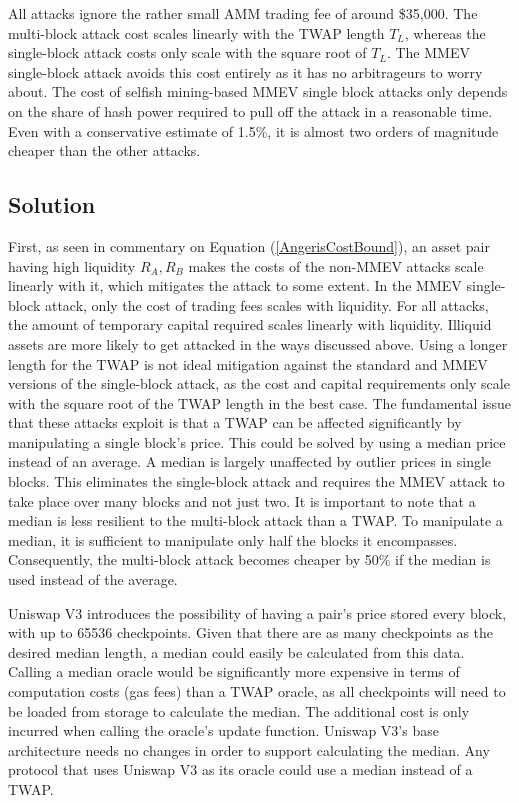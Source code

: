 \documentclass[conference]{IEEEtran}
\begin{document}
All attacks ignore the rather small AMM trading fee of around \$35,000. The multi-block attack cost scales linearly with the TWAP length $T_L$, whereas the single-block attack costs only scale with the square root of $T_L$. The MMEV single-block attack avoids this cost entirely as it has no arbitrageurs to worry about. The cost of selfish mining-based MMEV single block attacks only depends on the share of hash power required to pull off the attack in a reasonable time. Even with a conservative estimate of 1.5\%, it is almost two orders of magnitude cheaper than the other attacks.

\subsection{Solution \label{sectionPotentialSolution}}
First, as seen in commentary on Equation (\ref{AngerisCostBound}), an asset pair having high liquidity $R_A, R_B$ makes the costs of the non-MMEV attacks scale linearly with it, which mitigates the attack to some extent. In the MMEV single-block attack, only the cost of trading fees scales with liquidity. For all attacks, the amount of temporary capital required scales linearly with liquidity. Illiquid assets are more likely to get attacked in the ways discussed above. Using a longer length for the TWAP is not ideal mitigation against the standard and MMEV versions of the single-block attack, as the cost and capital requirements only scale with the square root of the TWAP length in the best case. The fundamental issue that these attacks exploit is that a TWAP can be affected significantly by manipulating a single block's price. This could be solved by using a median price instead of an average. A median is largely unaffected by outlier prices in single blocks. This eliminates the single-block attack and requires the MMEV attack to take place over many blocks and not just two. It is important to note that a median is less resilient to the multi-block attack than a TWAP. To manipulate a median, it is sufficient to manipulate only half the blocks it encompasses. Consequently, the multi-block attack becomes cheaper by 50\% if the median is used instead of the average.

Uniswap V3 \cite{Adams2021UniV3} introduces the possibility of having a pair's price stored every block, with up to 65536 checkpoints. Given that there are as many checkpoints as the desired median length, a median could easily be calculated from this data. Calling a median oracle would be significantly more expensive in terms of computation costs (gas fees) than a TWAP oracle, as all checkpoints will need to be loaded from storage to calculate the median. The additional cost is only incurred when calling the oracle's update function. Uniswap V3's base architecture needs no changes in order to support calculating the median. Any protocol that uses Uniswap V3 as its oracle could use a median instead of a TWAP.
\end{document}
